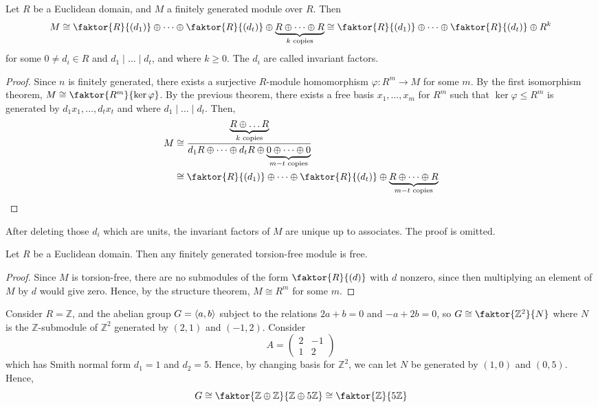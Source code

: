 \begin{theorem}
	Let \( R \) be a Euclidean domain, and \( M \) a finitely generated module over \( R \).
	Then
	\[
		M \cong \faktor{R}{(d_1)} \oplus \dots \oplus \faktor{R}{(d_t)} \oplus \underbrace{R \oplus \dots \oplus R}_{k \text{ copies}} \cong \faktor{R}{(d_1)} \oplus \dots \oplus \faktor{R}{(d_t)} \oplus R^k
	\]
	for some \( 0 \neq d_i \in R \) and \( d_1 \mid \dots \mid d_t \), and where \( k \geq 0 \).
	The \( d_i \) are called invariant factors.
\end{theorem}
\begin{proof}
	Since \( n \) is finitely generated, there exists a surjective \( R \)-module homomorphism \( \varphi \colon R^m \to M \) for some \( m \).
	By the first isomorphism theorem, \( M \cong \faktor{R^m}{\ker \varphi} \).
	By the previous theorem, there exists a free basis \( x_1, \dots, x_m \) for \( R^m \) such that \( \ker \varphi \leq R^m \) is generated by \( d_1 x_1, \dots, d_t x_t \) and where \( d_1 \mid \dots \mid d_t \).
	Then,
	\begin{align*}
		M & \cong \frac{\underbrace{R \oplus \dots R}_{k \text{ copies}}}{d_1 R \oplus \dots \oplus d_t R \oplus \underbrace{0 \oplus \dots \oplus 0}_{m-t \text{ copies}}} \\
		  & \cong \faktor{R}{(d_1)} \oplus \dots \oplus \faktor{R}{(d_t)} \oplus \underbrace{R \oplus \dots \oplus R}_{m-t \text{ copies}}
	\end{align*}
\end{proof}
\begin{remark}
	After deleting those \( d_i \) which are units, the invariant factors of \( M \) are unique up to associates.
	The proof is omitted.
\end{remark}
\begin{corollary}
	Let \( R \) be a Euclidean domain.
	Then any finitely generated torsion-free module is free.
\end{corollary}
\begin{proof}
	Since \( M \) is torsion-free, there are no submodules of the form \( \faktor{R}{(d)} \) with \( d \) nonzero, since then multiplying an element of \( M \) by \( d \) would give zero.
	Hence, by the structure theorem, \( M \cong R^m \) for some \( m \).
\end{proof}
\begin{example}
	Consider \( R = \mathbb Z \), and the abelian group \( G = \langle{} a,b \rangle \) subject to the relations \( 2a + b = 0 \) and \( -a + 2b = 0 \), so \( G \cong \faktor{\mathbb Z^2}{N} \) where \( N \) is the \( \mathbb Z \)-submodule of \( \mathbb Z^2 \) generated by \( (2,1) \) and \( (-1,2) \).
	Consider
	\[
		A = \begin{pmatrix}
			2 & -1 \\
			1 & 2
		\end{pmatrix}
	\]
	which has Smith normal form \( d_1 = 1 \) and \( d_2 = 5 \).
	Hence, by changing basis for \( \mathbb Z^2 \), we can let \( N \) be generated by \( (1,0) \) and \( (0,5) \).
	Hence,
	\[
		G \cong \faktor{\mathbb Z \oplus \mathbb Z}{\mathbb Z \oplus 5 \mathbb Z} \cong \faktor{\mathbb Z}{5\mathbb Z}
	\]
\end{example}

